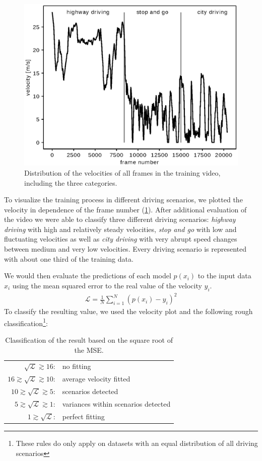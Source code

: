 \documentclass[conference]{IEEEtran}
\begin{document}
\begin{figure}[ht]
	\vspace{-0.5cm}
	\centering
	\includegraphics[width=0.7\columnwidth]{./imgs/plot_speed_time_new_splitting.eps}
	\caption{Distribution of the velocities of all frames in the training video, including the three categories.}
	\label{fig:SpeedPerFrameDistributionNewSplitting}
	\vspace{-0.2cm}
\end{figure}

To visualize the training process in different driving scenarios, we plotted the velocity in dependence of the frame number (\cref{fig:SpeedPerFrameDistributionNewSplitting}). After additional evaluation of the video we were able to classify three different driving scenarios: \emph{highway driving} with high and relatively steady velocities, \emph{stop and go} with low and fluctuating velocities as well as \emph{city driving} with very abrupt speed changes between medium and very low velocities. Every driving scenario is represented with about one third of the training data.

We would then evaluate the predictions of each model $p(x_i)$ to the input data $x_i$ using the mean squared error to the real value of the velocity $y_i$.
\begin{align}
	\mathcal{L} = \frac{1}{N} \sum_{i=1}^{N} (p(x_i) - y_i)^2
\end{align}
To classify the resulting value, we used the velocity plot and the 
following rough classification\footnote{These rules do only apply on datasets with an equal distribution 
of all driving scenarios}:
\begin{table}[h!]
\normalsize
\centering
\begin{tabular}{r l}
$\sqrt{\mathcal{L}} \gtrsim 16$: & no fitting\\
$16 \gtrsim \sqrt{\mathcal{L}} \gtrsim 10$: & average velocity fitted\\
$10 \gtrsim \sqrt{\mathcal{L}} \gtrsim 5$: & scenarios detected\\
$5 \gtrsim \sqrt{\mathcal{L}} \gtrsim 1$: & variances within scenarios detected\\
$1 \gtrsim \sqrt{\mathcal{L}}$: & perfect fitting
\end{tabular}
\caption{Classification of the result based on the square root of the MSE.}
\end{table}
\end{document}
